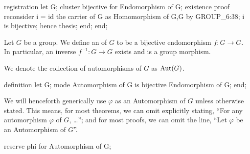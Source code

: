 \nwenddocs{}\endmoddef\nwstartdeflinemarkup{}\nwenddeflinemarkup
registration
  let G;
  cluster bijective for Endomorphism of G;
  existence
  proof
    reconsider i = id the carrier of G as Homomorphism of G,G by GROUP_6:38;
    i is bijective;
    hence thesis;
  end;
end;
\nwendcode{}\nwdocspar

\begin{definition*}
Let $G$ be a group. We define an  of $G$ to be a
bijective endomorphism $f\colon G\to G$. In particular, an inverse
$f^{-1}\colon G\to G$ exists and is a group morphism.
\end{definition*}

\begin{remark}
We denote the collection of automorphisms of $G$ as $\operatorname{Aut}(G)$.
\end{remark}

\nwenddocs{}\endmoddef\nwstartdeflinemarkup{}\nwenddeflinemarkup
definition
  let G;
  mode Automorphism of G is bijective Endomorphism of G;
end;
\eatline
{}\nwendcode{}\nwdocspar
\begin{reserve}
  We will henceforth generically use $\varphi$ as an Automorphism of $G$
  unless otherwise stated. This means, for most theorems, we can omit
  explicitly stating, ``For any automorphism $\varphi$ of $G$, \dots'';
  and for most proofs, we can omit the line, ``Let $\varphi$ be an
  Automorphism of $G$''.
\end{reserve}

\nwenddocs{}\endmoddef\nwstartdeflinemarkup{}\nwenddeflinemarkup
reserve phi for Automorphism of G;
\nwendcode{}\nwdocspar

